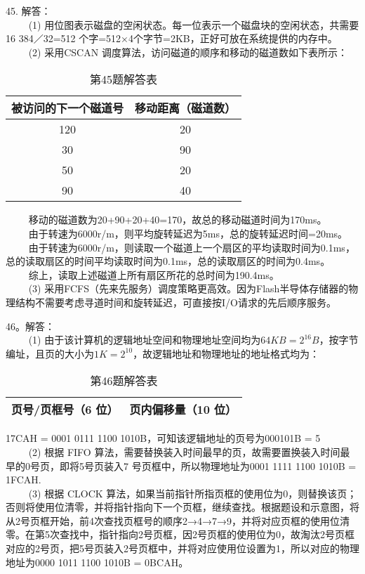 45. 解答：\\
$\qquad$ (1) 用位图表示磁盘的空闲状态。每一位表示一个磁盘块的空闲状态，共需要16 384／32=512 个字=512×4个字节=2KB，正好可放在系统提供的内存中。\\
$\qquad$ (2) 采用CSCAN 调度算法，访问磁道的顺序和移动的磁道数如下表所示：\\
\begin{table}[ht]
\centering
\caption{第45题解答表}\label{tab_CSN10_6}
\begin{tabular}{|c|c|}
\hline
被访问的下一个磁道号 & 移动距离（磁道数） \\
\hline
120 & 20 \\
\hline
30 & 90 \\
\hline
50 & 20 \\
\hline
90 & 40 \\
\hline
\end{tabular}
\end{table}
$\qquad$ 移动的磁道数为20+90+20+40=170，故总的移动磁道时间为170ms。  \\
$\qquad$ 由于转速为6000r/m，则平均旋转延迟为5ms，总的旋转延迟时间=20ms。 \\
$\qquad$ 由于转速为6000r/m，则读取一个磁道上一个扇区的平均读取时间为0.1ms，总的读取扇区的时间平均读取时间为0.1ms，总的读取扇区的时间为0.4ms。 \\
$\qquad$ 综上，读取上述磁道上所有扇区所花的总时间为190.4ms。 \\
$\qquad$ (3) 采用FCFS（先来先服务）调度策略更高效。因为Flash半导体存储器的物理结构不需要考虑寻道时间和旋转延迟，可直接按I/O请求的先后顺序服务。

46。解答： \\
$\qquad$ (1) 由于该计算机的逻辑地址空间和物理地址空间均为$64KB = 2^{16}B$，按字节编址，且页的大小为$1K = 2^{10}$，故逻辑地址和物理地址的地址格式均为： \\
\begin{table}[ht]
\centering
\caption{第46题解答表}\label{tab_CSN10_7}
\begin{tabular}{|c|c|}
\hline
页号/页框号（6 位） & 页内偏移量（10 位） \\
\hline
\end{tabular}
\end{table}
17CAH = 0001 0111 1100 1010B，可知该逻辑地址的页号为000101B = 5 \\
$\qquad$ (2) 根据 FIFO 算法，需要替换装入时间最早的页，故需要置换装入时间最早的0号页，即将5号页装入7 号页框中，所以物理地址为0001 1111 1100 1010B = 1FCAH. \\
$\qquad$ (3) 根据 CLOCK 算法，如果当前指针所指页框的使用位为0，则替换该页；否则将使用位清零，并将指针指向下一个页框，继续查找。根据题设和示意图，将从2号页框开始，前4次查找页框号的顺序2→4→7→9，并将对应页框的使用位清零。在第5次查找中，指针指向2号页框，因2号页框的使用位为0，故淘汰2号页框对应的2号页，把5号页装入2号页框中，并将对应使用位设置为1，所以对应的物理地址为0000 1011 1100 1010B = 0BCAH。

